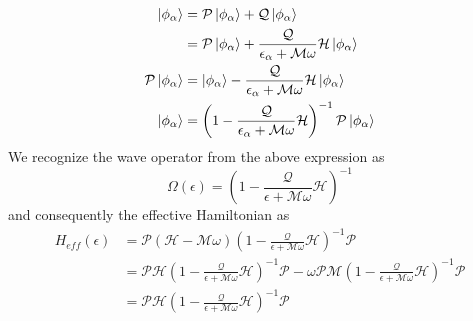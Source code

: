 \begin{align}
 \ket{\phi_\alpha} &= \mathcal{P}\ket{\phi_\alpha} + \mathcal{Q}\ket{\phi_\alpha} \nonumber \\
 &= \mathcal{P}\ket{\phi_\alpha} + \frac{\mathcal{Q}}{\epsilon_\alpha + \mathcal{M}\omega}\mathcal{H}\ket{\phi_\alpha} \nonumber \\
 \mathcal{P}\ket{\phi_\alpha} &= \ket{\phi_\alpha} - \frac{\mathcal{Q}}{\epsilon_\alpha + \mathcal{M}\omega}\mathcal{H}\ket{\phi_\alpha}  \nonumber \\
 \ket{\phi_\alpha} &= \left(1 - \frac{\mathcal{Q}}{\epsilon_\alpha + \mathcal{M}\omega}\mathcal{H}\right)^{-1}\mathcal{P}\ket{\phi_\alpha}
\end{align}
We recognize the wave operator from the above expression as
\begin{equation}
 \Omega(\epsilon) = \left(1 - \frac{\mathcal{Q}}{\epsilon + \mathcal{M}\omega}\mathcal{H}\right)^{-1}
\end{equation} and consequently the effective Hamiltonian as
\begin{align}
 H_{eff}(\epsilon) &= \mathcal{P}(\mathcal{H} - \mathcal{M}\omega)\left(1 - \frac{\mathcal{Q}}{\epsilon + \mathcal{M}\omega}\mathcal{H}\right)^{-1}\mathcal{P} \nonumber\\
 &= \mathcal{P}\mathcal{H}\left(1 - \frac{\mathcal{Q}}{\epsilon + \mathcal{M}\omega}\mathcal{H}\right)^{-1}\mathcal{P} - \omega\mathcal{P}\mathcal{M}\left(1 - \frac{\mathcal{Q}}{\epsilon + \mathcal{M}\omega}\mathcal{H}\right)^{-1}\mathcal{P} \nonumber\\
 &= \mathcal{P}\mathcal{H}\left(1 - \frac{\mathcal{Q}}{\epsilon + \mathcal{M}\omega}\mathcal{H}\right)^{-1}\mathcal{P}
\end{align} 

